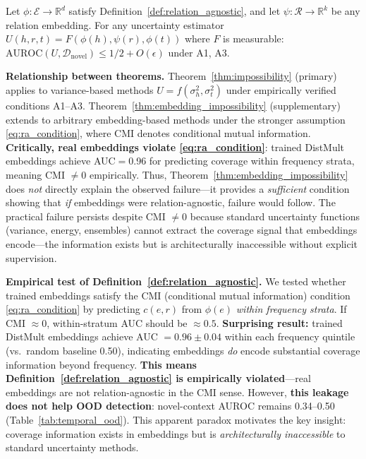 \begin{theorem}
\label{thm:embedding_impossibility}
Let $\phi: \mathcal{E} \to \mathbb{R}^d$ satisfy Definition~\ref{def:relation_agnostic}, and let $\psi: \mathcal{R} \to \mathbb{R}^k$ be any relation embedding. For any uncertainty estimator $U(h,r,t) = F(\phi(h), \psi(r), \phi(t))$ where $F$ is measurable: $\text{AUROC}(U, \mathcal{D}_{\text{novel}}) \leq 1/2 + O(\epsilon)$ under A1, A3.
\end{theorem}

\textbf{Relationship between theorems.} Theorem~\ref{thm:impossibility} (primary) applies to variance-based methods $U = f(\sigma^2_h, \sigma^2_t)$ under empirically verified conditions A1--A3. Theorem~\ref{thm:embedding_impossibility} (supplementary) extends to arbitrary embedding-based methods under the stronger assumption \eqref{eq:ra_condition}, where CMI denotes conditional mutual information. \textbf{Critically, real embeddings violate \eqref{eq:ra_condition}}: trained DistMult embeddings achieve AUC$=$0.96 for predicting coverage within frequency strata, meaning CMI $\neq 0$ empirically. Thus, Theorem~\ref{thm:embedding_impossibility} does \emph{not} directly explain the observed failure---it provides a \emph{sufficient} condition showing that \emph{if} embeddings were relation-agnostic, failure would follow. The practical failure persists despite CMI $\neq 0$ because standard uncertainty functions (variance, energy, ensembles) cannot extract the coverage signal that embeddings encode---the information exists but is architecturally inaccessible without explicit supervision.

\textbf{Empirical test of Definition~\ref{def:relation_agnostic}.}
We tested whether trained embeddings satisfy the CMI (conditional mutual information) condition \eqref{eq:ra_condition} by predicting $c(e,r)$ from $\phi(e)$ \emph{within frequency strata}. If CMI $\approx 0$, within-stratum AUC should be $\approx 0.5$. \textbf{Surprising result:} trained DistMult embeddings achieve AUC $= 0.96 \pm 0.04$ within each frequency quintile (vs.\ random baseline 0.50), indicating embeddings \emph{do} encode substantial coverage information beyond frequency. \textbf{This means Definition~\ref{def:relation_agnostic} is empirically violated}---real embeddings are not relation-agnostic in the CMI sense. However, \textbf{this leakage does not help OOD detection}: novel-context AUROC remains 0.34--0.50 (Table~\ref{tab:temporal_ood}). This apparent paradox motivates the key insight: coverage information exists in embeddings but is \emph{architecturally inaccessible} to standard uncertainty methods.

